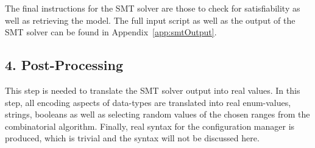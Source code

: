 The final instructions for the SMT solver are those to check for satisfiability as well as retrieving the model. The full input script as well as the output of the SMT solver can be found in Appendix~\ref{app:smtOutput}. 


\subsection*{4. Post-Processing}

This step is needed to translate the SMT solver output into real values. In this step, all encoding aspects of data-types are translated into real enum-values, strings, booleans as well as selecting random values of the chosen ranges from the combinatorial algorithm. Finally, real syntax for the configuration manager is produced, which is trivial and the syntax will not be discussed here.